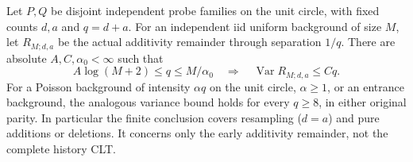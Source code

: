 \documentclass[11pt,letterpaper]{article}
\begin{document}
\begin{theorem}
\label{thm:fixed-probe-remainder-variance}
Let $P,Q$ be disjoint independent probe
families on the unit circle, with fixed counts $d,a$ and
$q=d+a$. For an independent iid uniform background of size $M$, let
$R_{M;d,a}$ be the actual additivity remainder through
separation $1/q$. There are absolute $A,C,\alpha_0<\infty$ such that
\begin{equation}\label{eq:fixed-probe-remainder-variance}
 A\log(M+2)\le q\le M/\alpha_0
       \quad\Longrightarrow\quad
             \operatorname{Var}R_{M;d,a}\le Cq.
\end{equation}
For a Poisson background of intensity $\alpha q$ on the unit
circle, $\alpha\ge1$, or an entrance background, the analogous
variance bound holds for every $q\ge8$, in either original parity.
In particular the finite conclusion covers resampling
($d=a$) and pure additions or deletions. It concerns only
the early additivity remainder, not the complete history CLT.
\end{theorem}
\end{document}
